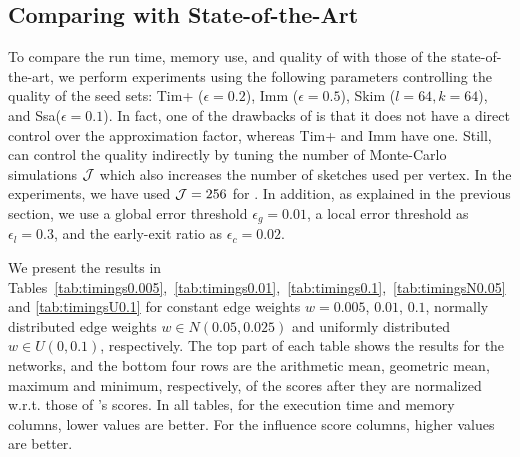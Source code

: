 

    

\subsection{Comparing \acro with State-of-the-Art}
To compare the run time, memory use, and quality of \acro with those of the state-of-the-art, %
we perform experiments using the following parameters controlling the quality of the seed sets: {\sc Tim+} ($\epsilon=0.2$), {\sc Imm} ($\epsilon=0.5$), {\sc Skim} ($l=64,k=64$), and {\sc Ssa}($\epsilon=0.1$). 
In fact, one of the drawbacks of \acro is that it does not have a direct control over the approximation factor, whereas {\sc Tim+} and {\sc Imm} have one. Still, \acro can control the quality indirectly by tuning the number of Monte-Carlo simulations ${\cal J}$ which also increases the number of sketches used per vertex. In the experiments, we have used ${\cal J} = 256$ for \acro. In addition, as explained in the previous section, we use a global error threshold $\epsilon_{g} = 0.01$, a local error threshold as $\epsilon_l=0.3$, and the early-exit ratio as $\epsilon_{c}=0.02$. 

We present the results in Tables~\ref{tab:timings0.005},~\ref{tab:timings0.01},~\ref{tab:timings0.1},~\ref{tab:timingsN0.05} and \ref{tab:timingsU0.1}  for constant edge weights $w = 0.005$, $0.01$, $0.1$, normally distributed edge weights $w \in N(0.05,0.025)$ and uniformly distributed $w \in U(0,0.1)$, respectively. The top part of each table shows the  results for the networks, and the bottom four rows are the arithmetic mean, geometric mean, maximum and minimum, respectively, of the scores after they are normalized w.r.t. those of \acro's scores. In all tables, for the execution time and memory columns, lower values are better. For the influence score columns, higher values are better. 


